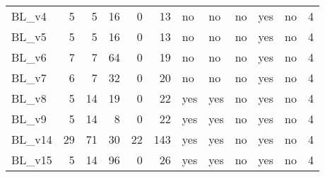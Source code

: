 \begin{tabular}{lrrrrrllllll}
BL\_v4 & {\cellcolor[HTML]{C2DFC2}} \color[HTML]{000000} 5 & {\cellcolor[HTML]{DAEBDA}} \color[HTML]{000000} 5 & {\cellcolor[HTML]{C4E0C4}} \color[HTML]{000000} 16 & {\cellcolor[HTML]{EBF3EB}} \color[HTML]{000000} 0 & {\cellcolor[HTML]{D9EAD9}} \color[HTML]{000000} 13 & no & no & no & yes & no & 4 \\
BL\_v5 & {\cellcolor[HTML]{C2DFC2}} \color[HTML]{000000} 5 & {\cellcolor[HTML]{DAEBDA}} \color[HTML]{000000} 5 & {\cellcolor[HTML]{C4E0C4}} \color[HTML]{000000} 16 & {\cellcolor[HTML]{EBF3EB}} \color[HTML]{000000} 0 & {\cellcolor[HTML]{D9EAD9}} \color[HTML]{000000} 13 & no & no & no & yes & no & 4 \\
BL\_v6 & {\cellcolor[HTML]{B2D7B2}} \color[HTML]{000000} 7 & {\cellcolor[HTML]{D4E8D4}} \color[HTML]{000000} 7 & {\cellcolor[HTML]{4EA64E}} \color[HTML]{F1F1F1} 64 & {\cellcolor[HTML]{EBF3EB}} \color[HTML]{000000} 0 & {\cellcolor[HTML]{D2E7D2}} \color[HTML]{000000} 19 & no & no & no & yes & no & 4 \\
BL\_v7 & {\cellcolor[HTML]{BBDCBB}} \color[HTML]{000000} 6 & {\cellcolor[HTML]{D4E8D4}} \color[HTML]{000000} 7 & {\cellcolor[HTML]{9CCD9C}} \color[HTML]{000000} 32 & {\cellcolor[HTML]{EBF3EB}} \color[HTML]{000000} 0 & {\cellcolor[HTML]{D0E6D0}} \color[HTML]{000000} 20 & no & no & no & yes & no & 4 \\
BL\_v8 & {\cellcolor[HTML]{C2DFC2}} \color[HTML]{000000} 5 & {\cellcolor[HTML]{BDDCBD}} \color[HTML]{000000} 14 & {\cellcolor[HTML]{BDDCBD}} \color[HTML]{000000} 19 & {\cellcolor[HTML]{EBF3EB}} \color[HTML]{000000} 0 & {\cellcolor[HTML]{CDE5CD}} \color[HTML]{000000} 22 & yes & yes & no & yes & no & 4 \\
BL\_v9 & {\cellcolor[HTML]{C2DFC2}} \color[HTML]{000000} 5 & {\cellcolor[HTML]{BDDCBD}} \color[HTML]{000000} 14 & {\cellcolor[HTML]{D7E9D7}} \color[HTML]{000000} 8 & {\cellcolor[HTML]{EBF3EB}} \color[HTML]{000000} 0 & {\cellcolor[HTML]{CDE5CD}} \color[HTML]{000000} 22 & yes & yes & no & yes & no & 4 \\
BL\_v14 & {\cellcolor[HTML]{008000}} \color[HTML]{F1F1F1} 29 & {\cellcolor[HTML]{008000}} \color[HTML]{F1F1F1} 71 & {\cellcolor[HTML]{A1CFA1}} \color[HTML]{000000} 30 & {\cellcolor[HTML]{8FC68F}} \color[HTML]{000000} 22 & {\cellcolor[HTML]{299429}} \color[HTML]{F1F1F1} 143 & yes & yes & no & yes & no & 4 \\
BL\_v15 & {\cellcolor[HTML]{C2DFC2}} \color[HTML]{000000} 5 & {\cellcolor[HTML]{BDDCBD}} \color[HTML]{000000} 14 & {\cellcolor[HTML]{008000}} \color[HTML]{F1F1F1} 96 & {\cellcolor[HTML]{EBF3EB}} \color[HTML]{000000} 0 & {\cellcolor[HTML]{C8E2C8}} \color[HTML]{000000} 26 & yes & yes & no & yes & no & 4 \\
\end{tabular}
